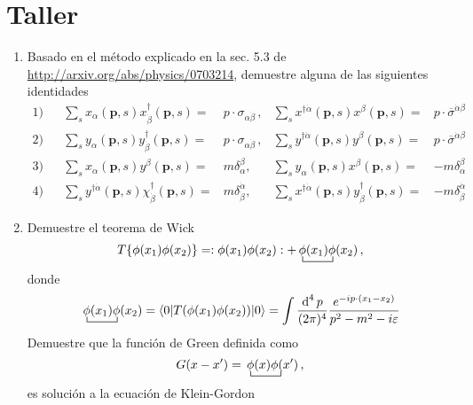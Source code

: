 \documentclass{article}
\begin{document}
\section{Taller}

\begin{enumerate}
\item Basado en el método explicado en la sec. 5.3 de \url{http://arxiv.org/abs/physics/0703214}, demuestre alguna de las siguientes identidades
  \begin{align*}
1)&&  \sum_s x_{\alpha}(\mathbf{p},s)x^{\dagger}_{\dot{\beta}}(\mathbf{p},s)=&p\cdot \sigma_{\alpha\dot{\beta}}\,, &    \sum_s x^{\dagger \dot{\alpha}}(\mathbf{p},s) x^{\beta}(\mathbf{p},s)=&p\cdot \overline{\sigma}^{\dot{\alpha}\beta}\nonumber\\
2)&&  \sum_s y_{\alpha}(\mathbf{p},s)y^{\dagger}_{\dot{\beta}}(\mathbf{p},s)=&p\cdot \sigma_{\alpha\dot{\beta}}\,, &   \sum_s y^{\dagger \dot{\alpha}}(\mathbf{p},s) y^{\beta}(\mathbf{p},s)=&p\cdot \overline{\sigma}^{\dot{\alpha}\beta} \nonumber\\
3)&& \sum_{s} x_{\alpha}({\boldsymbol{p}}, s) y^{\beta}({\boldsymbol{p}}, s)=&m \delta_{\alpha}^{\beta}, & \sum_{s} y_{\alpha}({\boldsymbol{p}}, s) x^{\beta}({\boldsymbol{p}}, s)=&-m \delta_{\alpha}^{\beta} \nonumber\\
4)&& \sum_{s} y^{\dagger \dot{\alpha}}({\boldsymbol{p}}, s) \chi_{\dot{\beta}}^{\dagger}({\boldsymbol{p}}, s)=&m \delta^{\dot{\alpha}}_{\dot{\beta}}, & \sum_{s} x^{\dagger \dot{\alpha}}({\boldsymbol{p}}, s) y_{\dot{\beta}}^{\dagger}({\boldsymbol{p}}, s)=&-m \delta^{\dot{\alpha}}_{\dot{\beta}}
\end{align*}

\item Demuestre el teorema de Wick
\begin{align}
 T\{\phi(x_1)\phi(x_2)\}=:\phi(x_1)\phi(x_2):+\bcontraction{\,}{\phi}{(x_1)}{\phi}
\,\phi(x_1)\phi(x_2)\,,
\end{align}
donde
\begin{align}
\bcontraction{\,}{\phi}{(x_1)}{\phi}
  \,\phi(x_1)\phi(x_2)=\langle0|T(\phi(x_1)\phi(x_2))|0\rangle=\int \frac{\operatorname{d}^{4} p}{(2 \pi)^{4}} \frac{e^{-i p \cdot\left(x_1-x_2\right)}}{p^2-m^2-i \varepsilon}
\end{align}
Demuestre que la función de Green definida como
\begin{align}
  G(x-x')=\bcontraction{\,}{\phi}{(x_1)}{\phi}
  \,\phi(x)\phi(x')\,,
\end{align}
es solución a la ecuación de Klein-Gordon

\end{enumerate}
\end{document}

